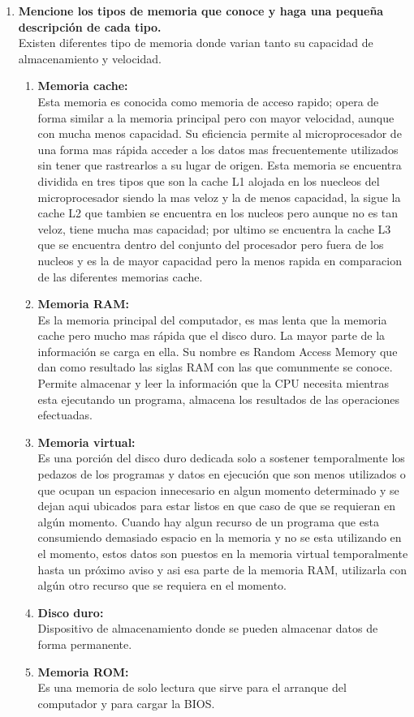 \documentclass{article}
\begin{document}
\begin{enumerate}
    \item \textbf{Mencione los tipos de memoria que conoce y haga una pequeña descripción de cada tipo.}\\
    Existen diferentes tipo de memoria donde varian tanto su capacidad de almacenamiento y velocidad.\\
    \begin{enumerate}
        \item \textbf{Memoria cache:} \\
        Esta memoria es conocida como memoria de acceso rapido; opera de forma similar a la memoria principal pero con mayor velocidad, aunque con mucha menos capacidad. Su eficiencia permite al microprocesador de una forma mas rápida acceder a los datos mas frecuentemente utilizados sin tener que rastrearlos a su lugar de origen. \cite{concepto} Esta memoria se encuentra dividida en tres tipos que son la cache L1 alojada en los nuecleos del microprocesador siendo la mas veloz y la de menos capacidad, la sigue la cache L2 que tambien se encuentra en los nucleos pero aunque no es tan veloz, tiene mucha mas capacidad; por ultimo se encuentra la cache L3 que se encuentra dentro del conjunto del procesador pero fuera de los nucleos y es la de mayor capacidad pero la menos rapida en comparacion de las diferentes memorias cache. \cite{augusto}
        \item \textbf{Memoria RAM:}\\
        Es la memoria principal del computador, es mas lenta que la memoria cache pero mucho mas rápida que el disco duro. La mayor parte de la información se carga en ella. Su nombre es Random Access Memory que dan como resultado las siglas RAM con las que comunmente se conoce. \cite{augusto}
        Permite almacenar y leer la información que la CPU necesita mientras esta ejecutando un programa, almacena los resultados de las operaciones efectuadas. \cite{ecured}
        \item \textbf{Memoria virtual:}\\
        Es una porción del disco duro dedicada solo a sostener temporalmente los pedazos de los programas y datos en ejecución que son menos utilizados o que ocupan un espacion innecesario en algun momento determinado y se dejan aqui ubicados para estar listos en que caso de que se requieran en algún momento. Cuando hay algun recurso de un programa que esta consumiendo demasiado espacio en la memoria y no se esta utilizando en el momento, estos datos son puestos en la memoria virtual temporalmente hasta un próximo aviso y asi esa parte de la memoria RAM, utilizarla con algún otro recurso que se requiera en el momento.
        \item \textbf{Disco duro:}\\
        Dispositivo de almacenamiento donde se pueden almacenar datos de forma permanente. 
        \item \textbf{Memoria ROM:}\\
        Es una memoria de solo lectura que sirve para el arranque del computador y para cargar la BIOS.
       

\end{enumerate}
\end{enumerate}
\end{document}
